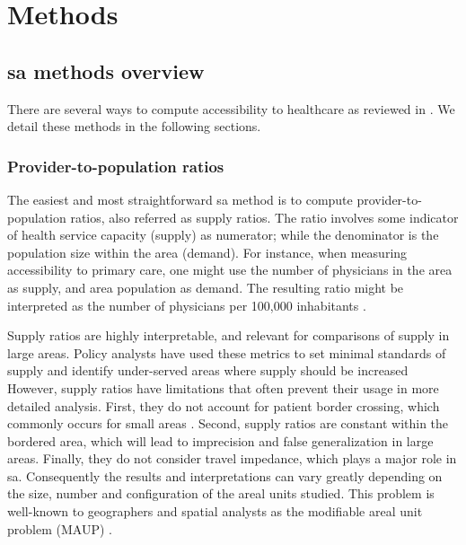 \section{Methods}

\subsection{\acf{sa} methods overview}

There are several ways to compute accessibility to healthcare as reviewed in
\cite{guagliardo_spatial_2004}. We detail these methods in the following
sections.

\subsubsection{Provider-to-population ratios}

The easiest and most straightforward \ac{sa} method is to compute
provider-to-population ratios, also referred as supply ratios. The ratio
involves some indicator of health service capacity (supply) as numerator; while
the denominator is the population size within the area (demand). For instance,
when measuring accessibility to primary care, one might use the number of
physicians in the area as supply, and area population as demand. The resulting
ratio might be interpreted as the number of physicians per 100,000 inhabitants
\cite{schonfeld_numbers_1972}.

Supply ratios are highly interpretable, and relevant for comparisons of supply
in large areas. Policy analysts have used these metrics to set minimal standards
of supply and identify under-served areas where supply should be increased
\cite{schonfeld_numbers_1972,council_on_graduate_medical_education_physician_1998,connor_competition_1995}%
However, supply ratios have limitations that often prevent their usage in more
detailed analysis. First, they do not account for patient border crossing, which
commonly occurs for small areas
\cite{connor_measuring_1994,basu_border-crossing_1996,basu_medicare_1995,holahan_border_1993}.
Second, supply ratios are constant within the bordered area, which will lead to
imprecision and false generalization in large areas. Finally, they do not
consider travel impedance, which plays a major role in \ac{sa}. Consequently the
results and interpretations can vary greatly depending on the size, number and
configuration of the areal units studied. This problem is well-known to
geographers and spatial analysts as the modifiable areal unit problem (MAUP)
\cite{openshaw_modifiable_1983}.

